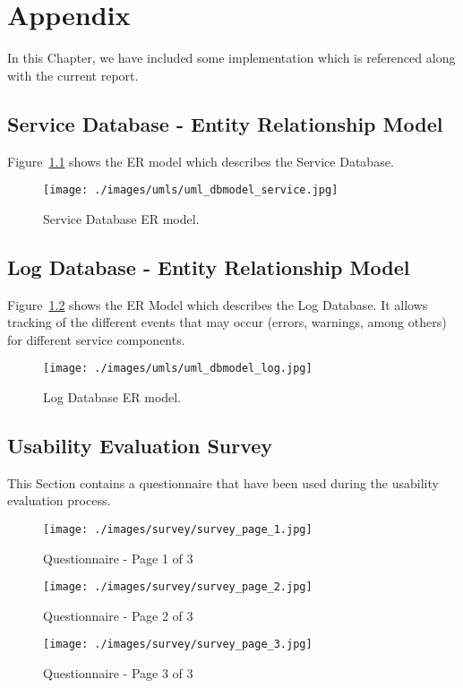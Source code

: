 \appendix
\chapter{Appendix}
\label{attachments}
In this Chapter, we have included some implementation which is referenced along with the current report.

\section{Service Database - Entity Relationship Model}
\label{sec:ServiceDatabase}
Figure~\ref{fig:serviceDatabaseER} shows the ER model which describes the Service Database.

\begin{figure}[h!]
 \centering
   \texttt{[image: ./images/umls/uml\_dbmodel\_service.jpg]}
   \caption{Service Database ER model.}
   \label{fig:serviceDatabaseER}
\end{figure}
\newpage

\section{Log Database - Entity Relationship Model}
\label{sec:AttachmentsLogDatabase}
Figure~\ref{fig:logDatabaseER} shows the ER Model which describes the Log Database. It allows tracking of the different events that may occur (errors, warnings, among others) for different service components.

\begin{figure}[h!]
 \centering
   \texttt{[image: ./images/umls/uml\_dbmodel\_log.jpg]}
   \caption{Log Database ER model.}
   \label{fig:logDatabaseER}
\end{figure}
\newpage

\section{Usability Evaluation Survey}
\label{sec:survey}
This Section contains a questionnaire that have been used during the usability evaluation process.
\begin{figure}[h!]
 \centering
   \texttt{[image: ./images/survey/survey\_page\_1.jpg]}
   \caption{Questionnaire - Page 1 of 3}
   \label{fig:surveyPage1}
\end{figure}
\newpage

\begin{figure}[h!]
 \centering
   \texttt{[image: ./images/survey/survey\_page\_2.jpg]}
   \caption{Questionnaire - Page 2 of 3}
   \label{fig:surveyPage1}
\end{figure}
\newpage

\begin{figure}[h!]
 \centering
   \texttt{[image: ./images/survey/survey\_page\_3.jpg]}
   \caption{Questionnaire - Page 3 of 3}
   \label{fig:surveyPage1}
\end{figure}